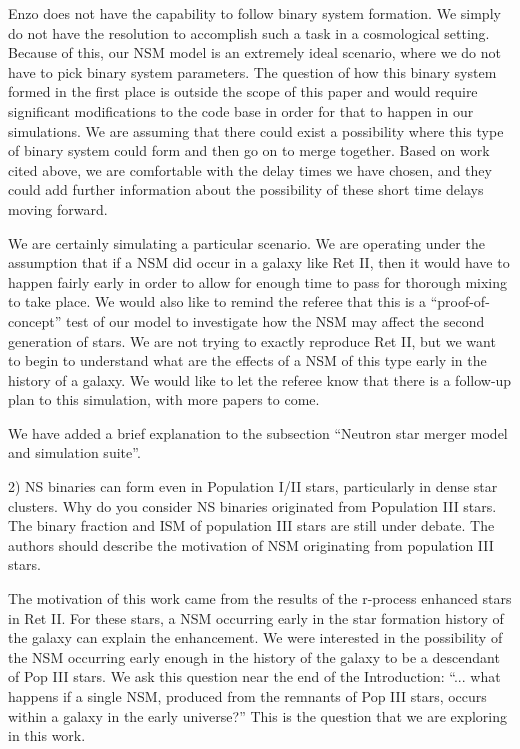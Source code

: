 \documentclass[11pt]{article}
\begin{document}
Enzo does not have the capability to follow binary system formation. We simply do not have the resolution to accomplish such a task in a cosmological setting. Because of this, our NSM model is an extremely ideal scenario, where we do not have to pick binary system parameters. The question of how this binary system formed in the first place is outside the scope of this paper and would require significant modifications to the code base in order for that to happen in our simulations. We are assuming that there could exist a possibility where this type of binary system could form and then go on to merge together. Based on work cited above, we are comfortable with the delay times we have chosen, and they could add further information about the possibility of these short time delays moving forward.

We are certainly simulating a particular scenario. We are operating under the assumption that if a NSM did occur in a galaxy like Ret II, then it would have to happen fairly early in order to allow for enough time to pass for thorough mixing to take place. We would also like to remind the referee that this is a ``proof-of-concept'' test of our model to investigate how the NSM may affect the second generation of stars. We are not trying to exactly reproduce Ret II, but we want to begin to understand what are the effects of a NSM of this type early in the history of a galaxy. We would like to let the referee know that there is a follow-up plan to this simulation, with more papers to come.

We have added a brief explanation to the subsection ``Neutron star merger model and simulation suite''.

\begin{tcolorbox}[colback={lightgray}]
    2)      NS binaries can form even in Population I/II stars, particularly in dense star clusters. Why do you consider NS binaries originated from Population III stars. The binary fraction and ISM of population III stars are still under debate. The authors should describe the motivation of NSM originating from population III stars.
\end{tcolorbox}

The motivation of this work came from the results of the r-process enhanced stars in Ret II. For these stars, a NSM occurring early in the star formation history of the galaxy can explain the enhancement. We were interested in the possibility of the NSM occurring early enough in the history of the galaxy to be a descendant of Pop III stars. We ask this question near the end of the Introduction: ``... what happens if a single NSM, produced from the remnants of Pop III stars, occurs within a galaxy in the early universe?'' This is the question that we are exploring in this work.
\end{document}
